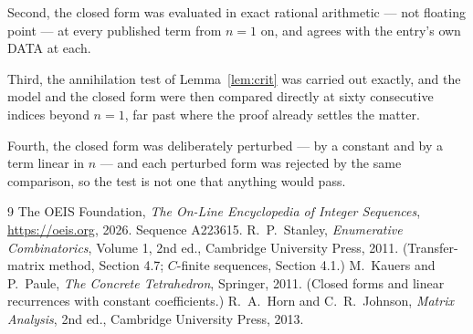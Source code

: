 \documentclass[11pt,a4paper]{article}
\theoremstyle{plain}
\theoremstyle{definition}
\begin{document}
Second, the closed form was evaluated in exact rational arithmetic --- not floating point ---
at every published term from $n=1$ on, and agrees with the entry's own DATA at each.

Third, the annihilation test of Lemma~\ref{lem:crit} was carried out exactly, and the model
and the closed form were then compared directly at sixty consecutive indices beyond
$n=1$, far past where the proof already settles the matter.

Fourth, the closed form was deliberately perturbed --- by a constant and by a term linear in
$n$ --- and each perturbed form was rejected by the same comparison, so the test is not one
that anything would pass.

\begin{thebibliography}{9}
 The OEIS Foundation, \emph{The On-Line Encyclopedia of Integer
Sequences}, \url{https://oeis.org}, 2026. Sequence A223615.
 R.~P.~Stanley, \emph{Enumerative Combinatorics}, Volume 1, 2nd ed.,
Cambridge University Press, 2011. (Transfer-matrix method, Section 4.7; $C$-finite sequences,
Section 4.1.)
 M.~Kauers and P.~Paule, \emph{The Concrete Tetrahedron}, Springer, 2011.
(Closed forms and linear recurrences with constant coefficients.)
 R.~A.~Horn and C.~R.~Johnson, \emph{Matrix Analysis}, 2nd ed., Cambridge
University Press, 2013.
\end{thebibliography}
\end{document}
